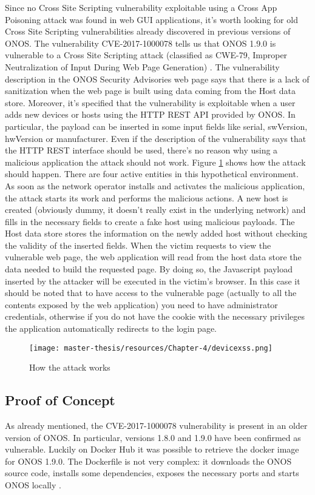 \documentclass[a4paper,10pt]{memoir}
\begin{document}
Since no Cross Site Scripting vulnerability exploitable using a Cross App Poisoning attack was found in web GUI applications, it's worth looking for old Cross Site Scripting vulnerabilities already discovered in previous versions of ONOS. The vulnerability CVE-2017-1000078 tells us that ONOS 1.9.0 is vulnerable to a Cross Site Scripting attack (classified as CWE-79, Improper Neutralization of Input During Web Page Generation) \cite{CVE-2017-1000078}. The vulnerability description in the ONOS Security Advisories web page says that there is a lack of sanitization when the web page is built using data coming from the Host data store. Moreover, it's specified that the vulnerability is exploitable when a user adds new devices or hosts using the HTTP REST API provided by ONOS. In particular, the payload can be inserted in some input fields like serial, swVersion, hwVersion or manufacturer. Even if the description of the vulnerability says that the HTTP REST interface should be used, there's no reason why using a malicious application the attack should not work. Figure \ref{fig:devicexss} shows how the attack should happen. There are four active entities in this hypothetical environment. As soon as the network operator installs and activates the malicious application, the attack starts its work and performs the malicious actions. A new host is created (obviously dummy, it doesn't really exist in the underlying network) and fills in the necessary fields to create a fake host using malicious payloads. The Host data store stores the information on the newly added host without checking the validity of the inserted fields. When the victim requests to view the vulnerable web page, the web application will read from the host data store the data needed to build the requested page. By doing so, the Javascript payload inserted by the attacker will be executed in the victim's browser. In this case it should be noted that to have access to the vulnerable page (actually to all the contents exposed by the web application) you need to have administrator credentials, otherwise if you do not have the cookie with the necessary privileges the application automatically redirects to the login page.

\begin{figure}[h]
\caption{How the attack works}
\label{fig:devicexss}
\texttt{[image: master-thesis/resources/Chapter-4/devicexss.png]}
\centering
\end{figure}

\subsection{Proof of Concept}
As already mentioned, the CVE-2017-1000078 vulnerability is present in an older version of ONOS. In particular, versions 1.8.0 and 1.9.0 have been confirmed as vulnerable. Luckily on Docker Hub it was possible to retrieve the docker image for ONOS 1.9.0. The Dockerfile is not very complex: it downloads the ONOS source code, installs some dependencies, exposes the necessary ports and starts ONOS locally \cite{dockeronos}.
\end{document}
